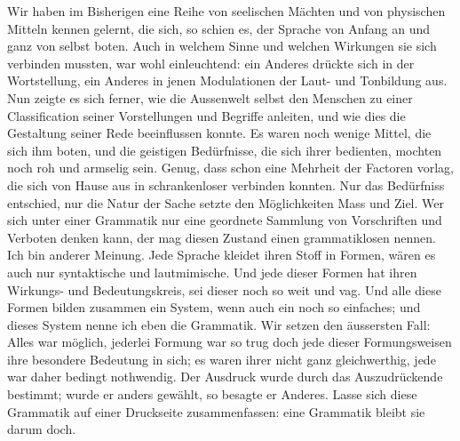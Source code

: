 Wir haben im Bisherigen eine Reihe von seelischen Mächten und von physischen Mitteln kennen gelernt, die sich, so schien es, der Sprache von Anfang an und ganz von selbst boten. Auch in welchem Sinne und  welchen Wirkungen sie sich verbinden mussten, war wohl einleuchtend: ein Anderes drückte sich in der Wortstellung, ein Anderes in jenen Modulationen der Laut- und Tonbildung aus. Nun zeigte es sich ferner, wie die Aussenwelt selbst den Menschen zu einer Classification seiner Vorstellungen und Begriffe anleiten, und wie dies die Gestaltung seiner Rede beeinflussen konnte. Es waren noch wenige Mittel, die sich ihm boten, und die geistigen Bedürfnisse, die sich ihrer bedienten, mochten noch roh und armselig sein. Genug, dass schon eine Mehrheit der Factoren vorlag, die sich von Hause aus in schrankenloser  verbinden konnten. Nur das Bedürfniss entschied, nur die Natur der Sache setzte den Möglichkeiten Mass und Ziel. Wer sich unter einer Grammatik nur eine geordnete Sammlung von Vorschriften und Verboten denken kann, der mag diesen Zustand einen grammatiklosen nennen. Ich bin anderer Meinung. Jede Sprache kleidet ihren Stoff in Formen, wären es auch nur syntaktische und lautmimische. Und jede dieser Formen hat ihren Wirkungs- und Bedeutungskreis, sei dieser noch so weit und vag. Und alle diese Formen bilden zusammen ein System, wenn auch ein noch so einfaches; und dieses System nenne ich eben die Grammatik. Wir setzen den äussersten Fall: Alles war möglich, jederlei Formung war  so trug doch jede dieser Formungsweisen ihre besondere Bedeutung in sich; es waren ihrer nicht  ganz gleichwerthig, jede war daher bedingt nothwendig. Der Ausdruck wurde durch das Auszudrückende bestimmt; wurde er anders gewählt, so besagte er Anderes. Lasse sich diese Grammatik auf einer Druckseite zusammenfassen: eine Grammatik bleibt sie darum doch.

\label{sp.386}


